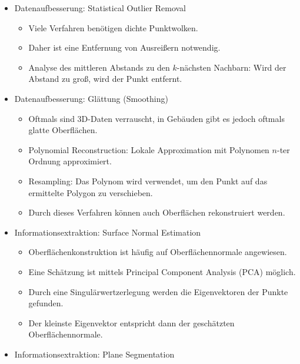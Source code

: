 				\begin{itemize}
					\item Datenaufbesserung: Statistical Outlier Removal
						\begin{itemize}
							\item Viele Verfahren benötigen dichte Punktwolken.
							\item Daher ist eine Entfernung von Ausreißern notwendig.
							\item Analyse des mittleren Abstands zu den \(k\)-nächsten Nachbarn: Wird der Abstand zu groß, wird der Punkt entfernt.
						\end{itemize}
					\item Datenaufbesserung: Glättung (Smoothing)
						\begin{itemize}
							\item Oftmals sind 3D-Daten verrauscht, in Gebäuden gibt es jedoch oftmals glatte Oberflächen.
							\item Polynomial Reconstruction: Lokale Approximation mit Polynomen \(n\)-ter Ordnung approximiert.
							\item Resampling: Das Polynom wird verwendet, um den Punkt auf das ermittelte Polygon zu verschieben.
							\item Durch dieses Verfahren können auch Oberflächen rekonstruiert werden.
						\end{itemize}
					\item Informationsextraktion: Surface Normal Estimation
						\begin{itemize}
							\item Oberflächenkonstruktion ist häufig auf Oberflächennormale angewiesen.
							\item Eine Schätzung ist \bspw mittels Principal Component Analysis (PCA) möglich.
							\item Durch eine Singulärwertzerlegung werden die Eigenvektoren der Punkte gefunden.
							\item Der kleinste Eigenvektor entspricht dann der geschätzten Oberflächennormale.
						\end{itemize}
					\item Informationsextraktion: Plane Segmentation
				\end{itemize}


